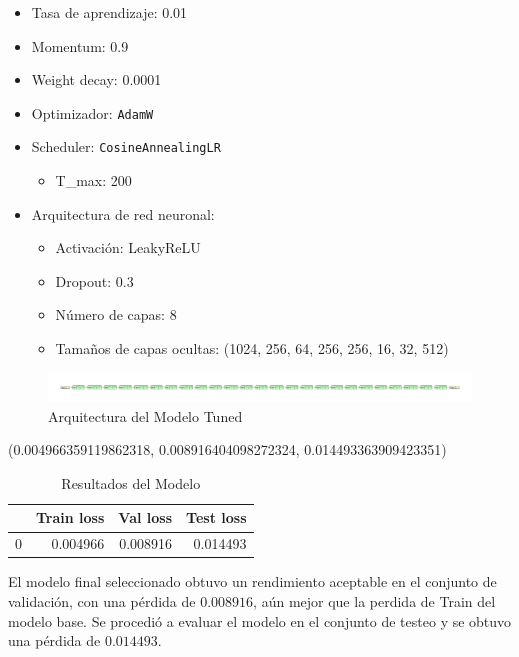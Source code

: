 \documentclass[
  a4paper,
]{article}
\providecommand{\tightlist}{%
  \setlength{\itemsep}{0pt}\setlength{\parskip}{0pt}}
\begin{document}
\begin{itemize}
\tightlist
\item
  Tasa de aprendizaje: 0.01
\item
  Momentum: 0.9
\item
  Weight decay: 0.0001
\item
  Optimizador: \texttt{AdamW}
\item
  Scheduler: \texttt{CosineAnnealingLR}

  \begin{itemize}
  \tightlist
  \item
    T\_max: 200
  \end{itemize}
\item
  Arquitectura de red neuronal:

  \begin{itemize}
  \tightlist
  \item
    Activación: LeakyReLU
  \item
    Dropout: 0.3
  \item
    Número de capas: 8
  \item
    Tamaños de capas ocultas: (1024, 256, 64, 256, 256, 16, 32, 512)
  \end{itemize}
\end{itemize}

\begin{figure}[H]
  \centering
  \includegraphics[width=\textwidth]{recursos_pdf/graficos/p2v_dist_model_tuned_H.pdf}
  \caption{Arquitectura del Modelo Tuned}
\end{figure}

(0.004966359119862318, 0.008916404098272324, 0.014493363909423351)

\begin{table}
\caption{Resultados del Modelo}
\label{tab:resultados_modelo_tuned}
\begin{center}
\begin{tabular}{lrrr}
\toprule
 & Train loss & Val loss & Test loss \\
\midrule
0 & 0.004966 & 0.008916 & 0.014493 \\
\bottomrule
\end{tabular}
\end{center}
\end{table}

El modelo final seleccionado obtuvo un rendimiento aceptable en el
conjunto de validación, con una pérdida de \(0.008916\), aún mejor que
la perdida de Train del modelo base. Se procedió a evaluar el modelo en
el conjunto de testeo y se obtuvo una pérdida de \(0.014493\).
\end{document}
